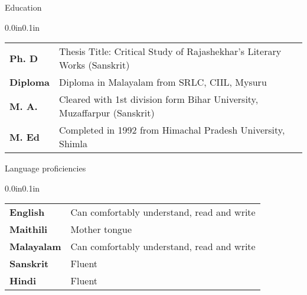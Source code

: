 \documentclass{resume} %
\makeatletter
\newcommand{\entry}[2]{#1 & #2 \tabularnewline} %
\newcommand{\tableEnv}[2]{%
  \begin{rSection}{#1} %
    \begin{adjustwidth}{0.0in}{0.1in} %
      \begin{tabularx}{\linewidth}{@{} >{\bfseries}l @{\hspace{6ex}} X @{}}
        #2 %
      \end{tabularx}
    \end{adjustwidth}
  \end{rSection}
}
\makeatother
\begin{document}

    \tableEnv{Education}{
    	\entry{Ph. D}{Thesis Title: Critical Study of Rajashekhar's Literary Works (Sanskrit) }
    	\entry{Diploma}{Diploma in Malayalam from SRLC, CIIL, Mysuru}
    	\entry{M. A.}{Cleared with 1st division form Bihar University, Muzaffarpur (Sanskrit)}
    	\entry{M. Ed}{Completed in 1992 from Himachal Pradesh University, Shimla}
    }
    


\tableEnv{Language proficiencies}{
    \entry{English}{Can comfortably understand, read and write}
    \entry{Maithili}{Mother tongue}
    \entry{Malayalam}{Can comfortably understand, read and write}
    \entry{Sanskrit}{Fluent}
    \entry{Hindi}{Fluent}
}
\end{document}
